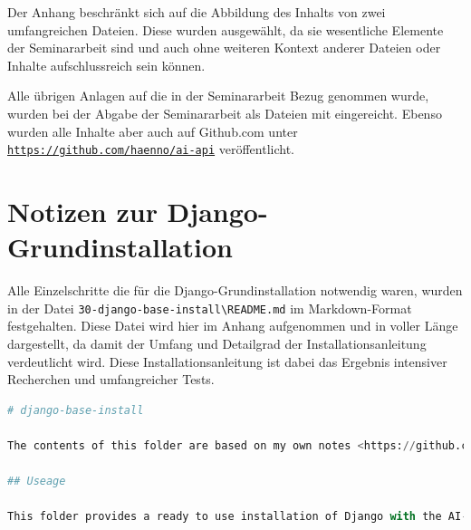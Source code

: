 \documentclass[12pt,oneside,titlepage,listof=totoc,bibliography=totoc]{scrartcl}
\newcommand{\code}[1]{\colorbox{code-gray}{\texttt{#1}}}
\begin{document}
\begin{appendices}
\makeatletter
\renewcommand\@seccntformat[1]{\csname the#1\endcsname:\quad}
\makeatother
{} %
	\renewcommand{\thesection}{\AppendixName\ \arabic{section}}
	\renewcommand\thesubsection{\AppendixName\ \arabic{section}.\arabic{subsection}}

Der Anhang beschränkt sich auf die Abbildung des Inhalts von zwei umfangreichen Dateien. Diese wurden ausgewählt, da sie wesentliche Elemente der Seminararbeit sind und auch ohne weiteren Kontext anderer Dateien oder Inhalte aufschlussreich sein können. 

Alle übrigen Anlagen auf die in der Seminararbeit Bezug genommen wurde, wurden bei der Abgabe der Seminararbeit als Dateien mit eingereicht. Ebenso wurden alle Inhalte aber auch auf Github.com unter \code{\url{https://github.com/haenno/ai-api}} veröffentlicht. 




\section{Notizen zur Django-Grundinstallation}\label{notes-djnago-base-install}

Alle Einzelschritte die für die Django-Grundinstallation notwendig waren, wurden in der Datei \code{30-django-base-install\textbackslash README.md} im Markdown-Format festgehalten. Diese Datei wird hier im Anhang aufgenommen und in voller Länge dargestellt, da damit der Umfang und Detailgrad der Installationsanleitung verdeutlicht wird. Diese Installationsanleitung ist dabei das Ergebnis intensiver Recherchen und umfangreicher Tests. 

\vspace{0.6cm} 

\begin{lstlisting}[language=python,numbers=none]
# django-base-install

The contents of this folder are based on my own notes <https://github.com/haenno/public-krams/blob/main/django-rest-notes.md> and the experience I made while developing a browser RPG adventure for a previous exam <https://github.com/tstsrv-de/rpg>.

## Useage

This folder provides a ready to use installation of Django with the AI-Application allready included. You can also make your own, clean install with the steps described in the next part. But if you just want to test it, take these steps:


\end{lstlisting}
\end{appendices}
\end{document}
